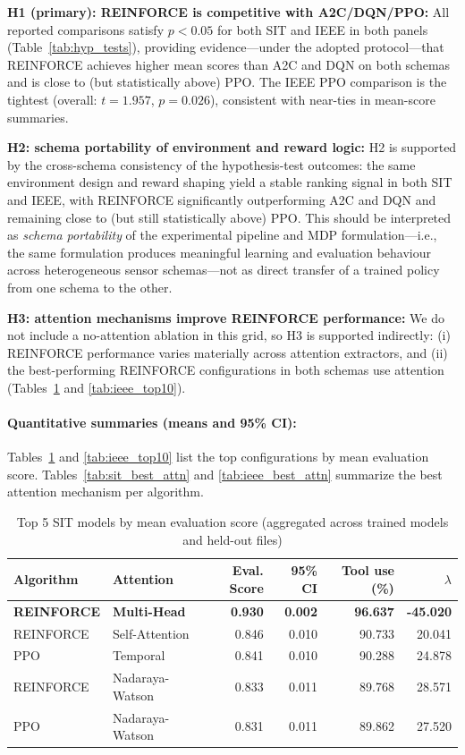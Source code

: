 \documentclass[sn-basic]{sn-jnl} %
\begin{document}
\textbf{H1 (primary): \textsc{REINFORCE} is competitive with A2C/DQN/PPO:}
All reported comparisons satisfy $p<0.05$ for both SIT and IEEE in both panels (Table~\ref{tab:hyp_tests}), providing evidence---under the adopted protocol---that \textsc{REINFORCE} achieves higher mean scores than \textsc{A2C} and \textsc{DQN} on both schemas and is close to (but statistically above) \textsc{PPO}. The IEEE \textsc{PPO} comparison is the tightest (overall: $t=1.957$, $p=0.026$), consistent with near-ties in mean-score summaries.

\textbf{H2: schema portability of environment and reward logic:}
H2 is supported by the cross-schema consistency of the hypothesis-test outcomes: the same environment design and reward shaping yield a stable ranking signal in both SIT and IEEE, with \textsc{REINFORCE} significantly outperforming \textsc{A2C} and \textsc{DQN} and remaining close to (but still statistically above) \textsc{PPO}. This should be interpreted as \emph{schema portability} of the experimental pipeline and MDP formulation---i.e., the same formulation produces meaningful learning and evaluation behaviour across heterogeneous sensor schemas---not as direct transfer of a trained policy from one schema to the other.

\textbf{H3: attention mechanisms improve \textsc{REINFORCE} performance:}
We do not include a no-attention ablation in this grid, so H3 is supported indirectly: (i) \textsc{REINFORCE} performance varies materially across attention extractors, and (ii) the best-performing \textsc{REINFORCE} configurations in both schemas use attention (Tables~\ref{tab:sit_top10} and \ref{tab:ieee_top10}).

\paragraph{Quantitative summaries (means and 95\% CI):}
Tables~\ref{tab:sit_top10} and \ref{tab:ieee_top10} list the top configurations by mean evaluation score. Tables~\ref{tab:sit_best_attn} and \ref{tab:ieee_best_attn} summarize the best attention mechanism per algorithm.

\begin{table}
\caption{Top 5 SIT models by mean evaluation score (aggregated across trained models and held-out files)}
\label{tab:sit_top10}
\begin{tabular}{ll r r r r}
\toprule
\textbf{Algorithm} & \textbf{Attention} & \textbf{Eval. Score} & \textbf{95\% CI} & \textbf{Tool use (\%)} & \textbf{$\lambda$}\\
\midrule
    \textbf{REINFORCE} & \textbf{Multi-Head} & \textbf{0.930} & \textbf{0.002} & \textbf{96.637} & \textbf{-45.020} \\
    REINFORCE & Self-Attention & 0.846 & 0.010 & 90.733 & 20.041 \\
    PPO & Temporal & 0.841 & 0.010 & 90.288 & 24.878 \\
    REINFORCE & Nadaraya-Watson & 0.833 & 0.011 & 89.768 & 28.571 \\
    PPO & Nadaraya-Watson & 0.831 & 0.011 & 89.862 & 27.520 \\
    \bottomrule
\end{tabular}
\end{table}
\end{document}

